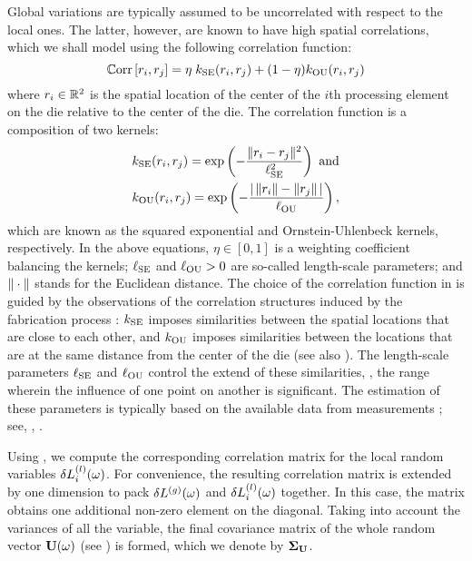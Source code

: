 Global variations are typically assumed to be uncorrelated with respect to the local ones.
The latter, however, are known to have high spatial correlations, which we shall model using the following correlation function:
\begin{equation} \elabel{correlation-function}
  \oCorr{\r_i, \r_j} = \eta \; \kernel_\SE(\r_i, \r_j) + (1 - \eta) \kernel_\OU(\r_i, \r_j)
\end{equation}
where $r_i \in \mathbb{R}^2$ is the spatial location of the center of the $i$th processing element on the die relative to the center of the die. The correlation function is a composition of two kernels:
\begin{align*}
  & k_{\text{SE}}(r_i, r_j) = \exp\left(-\frac{\| r_i - r_j \|^2}{\ell_{\text{SE}}^2}\right) \text{ and} \\
  & k_{\text{OU}}(r_i, r_j) = \exp\left(- \frac{| \,\| r_i \| - \| r_j \|\, |}{\ell_{\text{OU}}} \right),
\end{align*}
which are known as the squared exponential and Ornstein-Uhlenbeck kernels, respectively.
In the above equations, $\eta \in [0, 1]$ is a weighting coefficient balancing the kernels; $\ell_{\text{SE}}$ and $\ell_{\text{OU}} > 0$ are so-called length-scale parameters; and $\| \cdot \|$ stands for the Euclidean distance.
The choice of the correlation function in  is guided by the observations of the correlation structures induced by the fabrication process \cite{chandrakasan2001, friedberg2005, cheng2011}: $k_{\text{SE}}$ imposes similarities between the spatial locations that are close to each other, and $k_{\text{OU}}$ imposes similarities between the locations that are at the same distance from the center of the die (see also \cite{ghanem1991, ghanta2006}).
The length-scale parameters $\ell_{\text{SE}}$ and $\ell_{\text{OU}}$ control the extend of these similarities, \ie, the range wherein the influence of one point on another is significant. The estimation of these parameters is typically based on the available data from measurements \cite{ghanta2006}; see, \eg, \cite{friedberg2005}.

Using , we compute the corresponding correlation matrix for the local random variables $\delta L^{(l)}_i(\omega)$.
For convenience, the resulting correlation matrix is extended by one dimension to pack ${\delta L^{(g)}}(\omega)$ and $\delta L^{(l)}_i(\omega)$ together.
In this case, the matrix obtains one additional non-zero element on the diagonal.
Taking into account the variances of all the variable, the final covariance matrix of the whole random vector $\mathbf{U}(\omega)$ (see ) is formed, which we denote by $\mCorr_\vU$.

